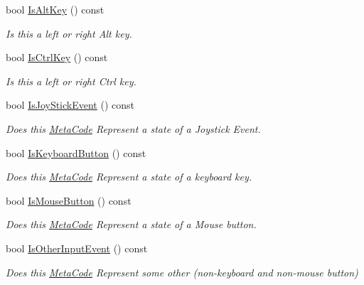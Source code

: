 \begin{DoxyCompactItemize}
bool \hyperlink{classMezzanine_1_1MetaCode_a330ca2c2cb69c7d0134a842753f6a397}{IsAltKey} () const 
\begin{DoxyCompactList}\small\item\em Is this a left or right Alt key. \item\end{DoxyCompactList}\item 
bool \hyperlink{classMezzanine_1_1MetaCode_af0328602a2dbcc082498f9049b8fd9c5}{IsCtrlKey} () const 
\begin{DoxyCompactList}\small\item\em Is this a left or right Ctrl key. \item\end{DoxyCompactList}\item 
bool \hyperlink{classMezzanine_1_1MetaCode_ab8d13132e795f34367ba3896bf05b5c2}{IsJoyStickEvent} () const 
\begin{DoxyCompactList}\small\item\em Does this \hyperlink{classMezzanine_1_1MetaCode}{MetaCode} Represent a state of a Joystick Event. \item\end{DoxyCompactList}\item 
bool \hyperlink{classMezzanine_1_1MetaCode_aedca54cabda99b18c4186ceb3bfa0944}{IsKeyboardButton} () const 
\begin{DoxyCompactList}\small\item\em Does this \hyperlink{classMezzanine_1_1MetaCode}{MetaCode} Represent a state of a keyboard key. \item\end{DoxyCompactList}\item 
bool \hyperlink{classMezzanine_1_1MetaCode_a4277faacd0e1633df7f30cbf7b8f5dd1}{IsMouseButton} () const 
\begin{DoxyCompactList}\small\item\em Does this \hyperlink{classMezzanine_1_1MetaCode}{MetaCode} Represent a state of a Mouse button. \item\end{DoxyCompactList}\item 
bool \hyperlink{classMezzanine_1_1MetaCode_a88c99813475a4968c498da57ee1304b2}{IsOtherInputEvent} () const 
\begin{DoxyCompactList}\small\item\em Does this \hyperlink{classMezzanine_1_1MetaCode}{MetaCode} Represent some other (non-\/keyboard and non-\/mouse button) \item\end{DoxyCompactList}\item 

\end{DoxyCompactItemize}
